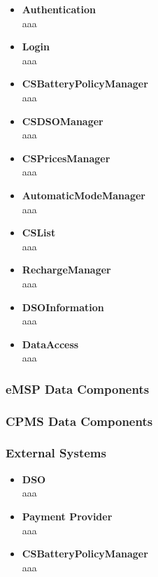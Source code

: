 \documentclass[11pt]{article}
\begin{document}
\begin{itemize}
    \item \textbf{Authentication} \\
        aaa
    \item \textbf{Login} \\
        aaa
    \item \textbf{CSBatteryPolicyManager} \\
        aaa
    \item \textbf{CSDSOManager} \\
        aaa
    \item \textbf{CSPricesManager} \\
        aaa
    \item \textbf{AutomaticModeManager} \\
        aaa
    \item \textbf{CSList} \\
        aaa
    \item \textbf{RechargeManager} \\
        aaa
    \item \textbf{DSOInformation} \\
        aaa
    \item \textbf{DataAccess} \\
        aaa
\end{itemize}

\subsubsection{eMSP Data Components}


\subsubsection{CPMS Data Components}


\subsubsection{External Systems}

\begin{itemize}
    \item \textbf{DSO} \\
        aaa
    \item \textbf{Payment Provider} \\
        aaa
    \item \textbf{CSBatteryPolicyManager} \\
        aaa
\end{itemize}
\end{document}
